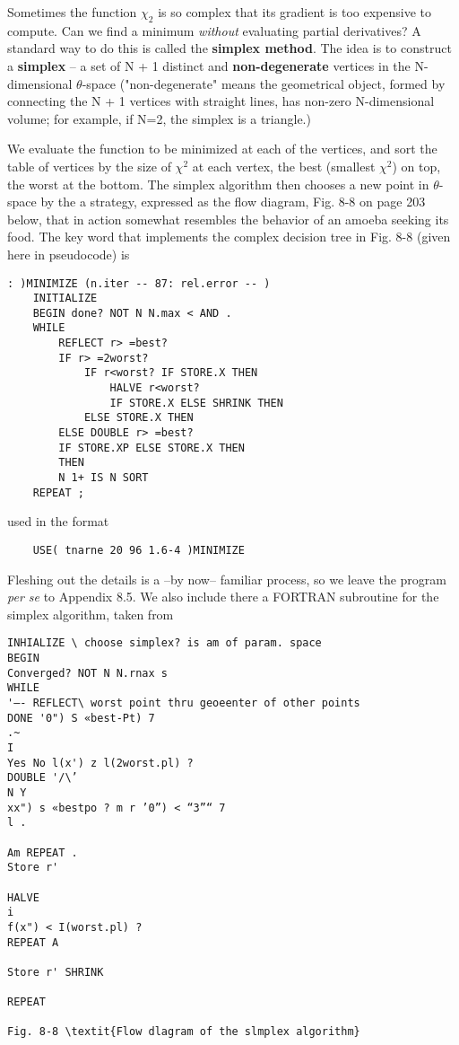 Sometimes the function $\chi_{2}$ is so complex that its gradient is too expensive to compute. Can we find a minimum \textit{without} evaluating partial derivatives? A standard way to do this is called the \textbf{simplex method}. The idea is to construct a \textbf{simplex} -- a set of N + 1 distinct and \textbf{non-degenerate} vertices in the N-dimensional $\theta$-space ("non-degenerate" means the geometrical object, formed by connecting the N + 1 vertices with straight lines, has non-zero N-dimensional volume; for example, if N=2, the simplex is a triangle.)

We evaluate the function to be minimized at each of the vertices, and sort the table of vertices by the size of $\chi^{2}$ at each vertex, the best (smallest $\chi^{2}$) on top, the worst at the bottom. The simplex algorithm then chooses a new point in $\theta$-space by the a strategy, expressed as the ﬂow diagram, Fig. 8-8 on page 203 below, that in action somewhat resembles the behavior of an amoeba seeking its food. The key word  that implements the complex decision tree in Fig. 8-8 (given here in pseudocode) is

\begin{lstlisting}
: )MINIMIZE (n.iter -- 87: rel.error -- )
    INITIALIZE
    BEGIN done? NOT N N.max < AND .
    WHILE
        REFLECT r> =best?
        IF r> =2worst?
            IF r<worst? IF STORE.X THEN
                HALVE r<worst?
                IF STORE.X ELSE SHRINK THEN
            ELSE STORE.X THEN
        ELSE DOUBLE r> =best?
        IF STORE.XP ELSE STORE.X THEN
        THEN
        N 1+ IS N SORT
    REPEAT ;
\end{lstlisting}

used in the format

\begin{lstlisting}
    USE( tnarne 20 96 1.6-4 )MINIMIZE
\end{lstlisting}

Fleshing out the details is a --by now-- familiar process, so we leave the program \textit{per se} to Appendix 8.5. We also include there a FORTRAN subroutine for the simplex algorithm, taken from

\begin{lstlisting}
INHIALIZE \ choose simplex? is am of param. space
BEGIN
Converged? NOT N N.rnax s
WHILE
'—- REFLECT\ worst point thru geoeenter of other points
DONE '0") S «best-Pt) 7
.~
I
Yes No l(x') z l(2worst.pl) ?
DOUBLE '/\’
N Y
xx") s «bestpo ? m r ’0”) < “3”“ 7
l .

Am REPEAT .
Store r'

HALVE
i
f(x") < I(worst.pl) ?
REPEAT A

Store r' SHRINK

REPEAT

Fig. 8-8 \textit{Flow dlagram of the slmplex algorithm}
\end{lstlisting}

